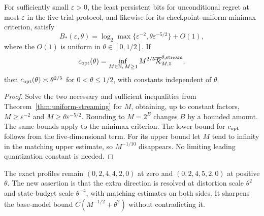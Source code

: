 \begin{corollary}\label{cor:uniform-bits}
For sufficiently small $\varepsilon>0$, the least persistent bits for
unconditional regret at most $\varepsilon$ in the five-trial protocol,
and likewise for its checkpoint-uniform minimax criterion, satisfy
\begin{equation}\label{eq:uniform-bits}
 B_*(\varepsilon,\theta)
   =\log_2\max\{\varepsilon^{-2},\theta\varepsilon^{-5/2}\}+O(1),
\end{equation}
where the $O(1)$ is uniform in $\theta\in[0,1/2]$. If
\[
 c_{\rm opt}(\theta)=\inf_{M\in\mathbb N,\,M\ge1}
           M^{2/5}\overline{\mathcal R}_{M,5}^{\theta,\mathrm{stream}},
\]
then $c_{\rm opt}(\theta)\asymp\theta^{2/5}$ for $0<\theta\le1/2$,
with constants independent of $\theta$.
\end{corollary}
\begin{proof}
Solve the two necessary and sufficient inequalities from
Theorem~\ref{thm:uniform-streaming} for $M$, obtaining, up to constant
factors, $M\ge\varepsilon^{-2}$ and $M\ge\theta\varepsilon^{-5/2}$.
Rounding to $M=2^B$ changes $B$ by a bounded amount. The same bounds
apply to the minimax criterion. The lower bound for $c_{\rm opt}$ follows
from the five-dimensional term. For its upper bound let $M$ tend to
infinity in the matching upper estimate, so
$M^{-1/10}$ disappears. No limiting leading quantization constant is
needed.
\end{proof}

The exact profiles remain $(0,2,4,4,2,0)$ at zero and
$(0,2,4,5,2,0)$ at positive $\theta$. The new assertion is that the extra
direction is resolved at distortion scale $\theta^2$ and state-budget
scale $\theta^{-4}$, with matching estimates on both sides. It sharpens
the base-model bound $C(M^{-1/2}+\theta^2)$ without contradicting it.
